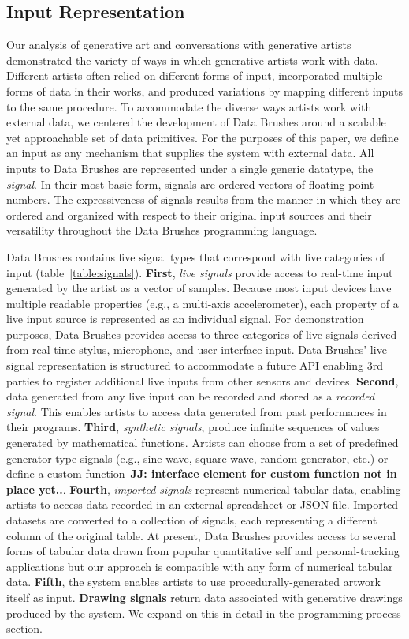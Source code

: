 \documentclass{sigchi}
\newcommand {\jen}[1]{{\color{teal}\bf{JJ: #1}\normalfont}}
\begin{document}
\subsection{Input Representation}
Our analysis of generative art and conversations with generative artists demonstrated the variety of ways in which generative artists work with data. Different artists often relied on different forms of input, incorporated multiple forms of data in their works, and produced variations by mapping different inputs to the same procedure. To accommodate the diverse ways artists work with external data, we centered the development of Data Brushes around a scalable yet approachable set of data primitives. For the purposes of this paper, we define an input as any mechanism that supplies the system with external data. All inputs to Data Brushes are represented under a single generic datatype, the \textit{signal}. In their most basic form, signals are ordered vectors of floating point numbers. The expressiveness of signals results from the manner in which they are ordered and organized with respect to their original input sources and their versatility throughout the Data Brushes programming language. 

Data Brushes contains five signal types that correspond with five categories of input (table~\ref{table:signals}). \textbf{First}, \textit{live signals} provide access to real-time input generated by the artist as a vector of samples. Because most input devices have multiple readable properties (e.g., a multi-axis accelerometer), each property of a live input source is represented as an individual signal. For demonstration purposes, Data Brushes provides access to three categories of live signals derived from real-time stylus, microphone, and user-interface input. Data Brushes' live signal representation is structured to accommodate a future API enabling 3rd parties to register additional live inputs from other sensors and devices. \textbf{Second}, data generated from any live input can be recorded and stored as a \textit{recorded signal}. This enables artists to access data generated from past performances in their programs. \textbf{Third}, \textit{synthetic signals}, produce infinite sequences of values generated by mathematical functions. Artists can choose from a set of predefined generator-type signals (e.g., sine wave, square wave, random generator, etc.) or define a custom function~\jen{interface element for custom function not in place yet..}. \textbf{Fourth}, \textit{imported signals} represent numerical tabular data, enabling artists to access data recorded in an external spreadsheet or JSON file. Imported datasets are converted to a collection of signals, each representing a different column of the original table. At present, Data Brushes provides access to several forms of tabular data drawn from popular quantitative self and personal-tracking applications but our approach is compatible with any form of numerical tabular data. \textbf{Fifth}, the system enables artists to use procedurally-generated artwork itself as input. \textbf{Drawing signals} return data associated with generative drawings produced by the system. We expand on this in detail in the programming process section. 
\end{document}
